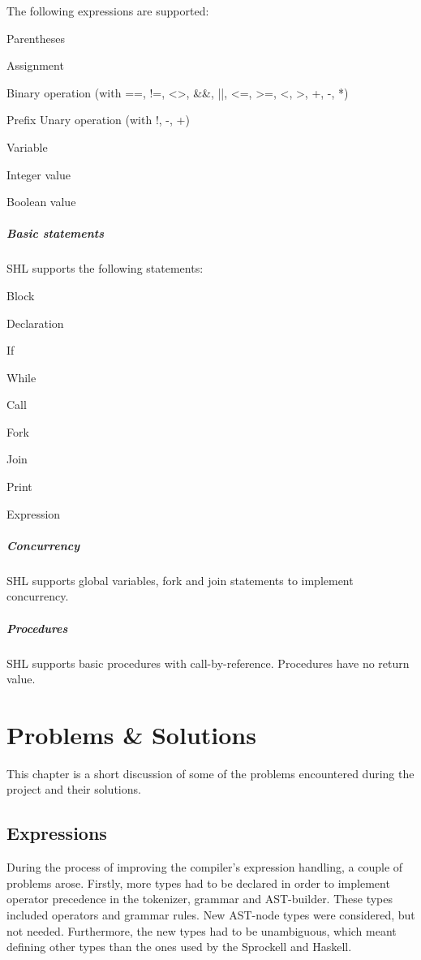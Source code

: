 \documentclass[twoside]{report}
\begin{document}
The following expressions are supported:
\begin{compactitem}
	\item Parentheses
	\item Assignment
	\item Binary operation (with ==, !=, <>, \&\&, ||, <=, >=, <, >, +, -, *)
	\item Prefix Unary operation (with !, -, +)
	\item Variable
	\item Integer value
	\item Boolean value
\end{compactitem}
\paragraph{Basic statements} SHL supports the following statements: 
\begin{compactitem}
	\item Block
	\item Declaration
	\item If 
	\item While
	\item Call
	\item Fork 
	\item Join
	\item Print
	\item Expression
\end{compactitem}
\paragraph{Concurrency} SHL supports global variables, fork and join statements to implement concurrency.
\paragraph{Procedures} SHL supports basic procedures with call-by-reference. Procedures have no return value.


\chapter{Problems \& Solutions}
\label{problems_and_solutions}
This chapter is a short discussion of some of the problems encountered during the project and their solutions.

\section{Expressions}
During the process of improving the compiler's expression handling, a couple of problems arose. Firstly, more types had to be declared in order to implement operator precedence in the tokenizer, grammar and AST-builder. These types included operators and grammar rules. New AST-node types were considered, but not needed. Furthermore, the new types had to be unambiguous, which meant defining other types than the ones used by the Sprockell and Haskell. \\
\end{document}

